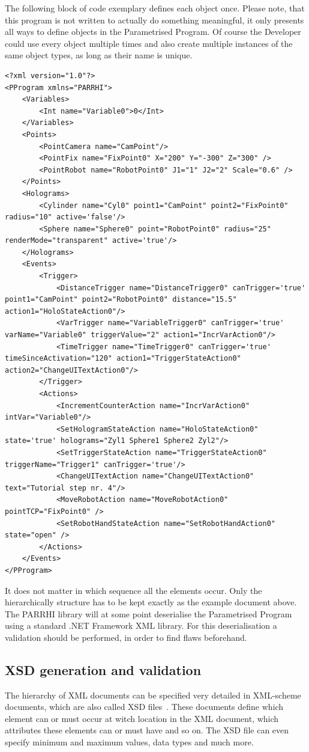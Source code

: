 The following block of code exemplary defines each object once. Please note, that this program is not written to actually do something meaningful, it only presents all ways to define objects in the Parametrised Program. Of course the Developer could use every object multiple times and also create multiple instances of the same object types, as long as their name is unique.

\begin{lstlisting}
<?xml version="1.0"?>
<PProgram xmlns="PARRHI">
	<Variables>
		<Int name="Variable0">0</Int>
	</Variables>
	<Points>
		<PointCamera name="CamPoint"/>
		<PointFix name="FixPoint0" X="200" Y="-300" Z="300" />
		<PointRobot name="RobotPoint0" J1="1" J2="2" Scale="0.6" />
	</Points>
	<Holograms>
		<Cylinder name="Cyl0" point1="CamPoint" point2="FixPoint0" radius="10" active='false'/>
		<Sphere name="Sphere0" point="RobotPoint0" radius="25" renderMode="transparent" active='true'/>
	</Holograms>
	<Events>
		<Trigger>
			<DistanceTrigger name="DistanceTrigger0" canTrigger='true' point1="CamPoint" point2="RobotPoint0" distance="15.5" action1="HoloStateAction0"/>
			<VarTrigger name="VariableTrigger0" canTrigger='true' varName="Variable0" triggerValue="2" action1="IncrVarAction0"/>
			<TimeTrigger name="TimeTrigger0" canTrigger='true' timeSinceActivation="120" action1="TriggerStateAction0" action2="ChangeUITextAction0"/>
		</Trigger>
		<Actions>
			<IncrementCounterAction name="IncrVarAction0" intVar="Variable0"/>
			<SetHologramStateAction name="HoloStateAction0" state='true' holograms="Zyl1 Sphere1 Sphere2 Zyl2"/>
			<SetTriggerStateAction name="TriggerStateAction0" triggerName="Trigger1" canTrigger='true'/>
			<ChangeUITextAction name="ChangeUITextAction0" text="Tutorial step nr. 4"/>
			<MoveRobotAction name="MoveRobotAction0" pointTCP="FixPoint0" />
			<SetRobotHandStateAction name="SetRobotHandAction0" state="open" />
		</Actions>
	</Events>
</PProgram>
\end{lstlisting}

It does not matter in which sequence all the elements occur. Only the hierarchically structure has to be kept exactly as the example document above. The PARRHI library will at some point deserialise the Parametrised Program using a standard .NET Framework XML library. For this deserialisation a validation should be performed, in order to find flaws beforehand.

\subsection{XSD generation and validation}
The hierarchy of XML documents can be specified very detailed in XML-scheme documents, which are also called XSD files~\cite{xsdW3C}. These documents define which element can or must occur at witch location in the XML document, which attributes these elements can or must have and so on. The XSD file can even specify minimum and maximum values, data types and much more.

